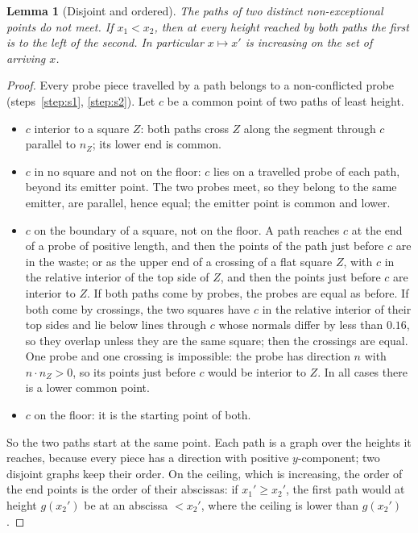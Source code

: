 \documentclass[11pt,letterpaper]{amsart}
\theoremstyle{plain}
\newtheorem{lemma}[theorem]{Lemma}
\theoremstyle{definition}
\theoremstyle{remark}
\begin{document}
\begin{lemma}[Disjoint and ordered]\label{lem:ordered}
The paths of two distinct non-exceptional points do not meet. If $x_1<x_2$, then at every height reached by both paths the first is to the left of the second. In particular $x\mapsto x'$ is increasing on the set of arriving $x$.
\end{lemma}
\begin{proof}
Every probe piece travelled by a path belongs to a non-conflicted probe (steps~\ref{step:s1}, \ref{step:s2}). Let $c$ be a common point of two paths of least height.
\begin{itemize}
\item $c$ interior to a square $Z$: both paths cross $Z$ along the segment through $c$ parallel to $n_Z$; its lower end is common.
\item $c$ in no square and not on the floor: $c$ lies on a travelled probe of each path, beyond its emitter point. The two probes meet, so they belong to the same emitter, are parallel, hence equal; the emitter point is common and lower.
\item $c$ on the boundary of a square, not on the floor. A path reaches $c$ at the end of a probe of positive length, and then the points of the path just before $c$ are in the waste; or as the upper end of a crossing of a flat square $Z$, with $c$ in the relative interior of the top side of $Z$, and then the points just before $c$ are interior to $Z$. If both paths come by probes, the probes are equal as before. If both come by crossings, the two squares have $c$ in the relative interior of their top sides and lie below lines through $c$ whose normals differ by less than $0.16$, so they overlap unless they are the same square; then the crossings are equal. One probe and one crossing is impossible: the probe has direction $n$ with $n\cdot n_Z>0$, so its points just before $c$ would be interior to $Z$. In all cases there is a lower common point.
\item $c$ on the floor: it is the starting point of both.
\end{itemize}
So the two paths start at the same point. Each path is a graph over the heights it reaches, because every piece has a direction with positive $y$-component; two disjoint graphs keep their order. On the ceiling, which is increasing, the order of the end points is the order of their abscissas: if $x_1'\ge x_2'$, the first path would at height $g(x_2')$ be at an abscissa $<x_2'$, where the ceiling is lower than $g(x_2')$.
\end{proof}
\end{document}
